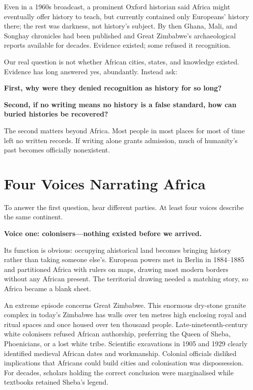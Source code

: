 Even in a 1960s broadcast, a prominent Oxford historian said Africa might eventually offer history to teach, but currently contained only Europeans' history there; the rest was darkness, not history's subject. By then Ghana, Mali, and Songhay chronicles had been published and Great Zimbabwe's archaeological reports available for decades. Evidence existed; some refused it recognition.

Our real question is not whether African cities, states, and knowledge existed. Evidence has long answered yes, abundantly. Instead ask:

\textbf{First, why were they denied recognition as history for so long?}

\textbf{Second, if no writing means no history is a false standard, how can buried histories be recovered?}

The second matters beyond Africa. Most people in most places for most of time left no written records. If writing alone grants admission, much of humanity's past becomes officially nonexistent.

\section{Four Voices Narrating Africa}
To answer the first question, hear different parties. At least four voices describe the same continent.

\textbf{Voice one: colonisers---nothing existed before we arrived.}

Its function is obvious: occupying ahistorical land becomes bringing history rather than taking someone else's. European powers met in Berlin in 1884--1885 and partitioned Africa with rulers on maps, drawing most modern borders without any African present. The territorial drawing needed a matching story, so Africa became a blank sheet.

An extreme episode concerns Great Zimbabwe. This enormous dry-stone granite complex in today's Zimbabwe has walls over ten metres high enclosing royal and ritual spaces and once housed over ten thousand people. Late-nineteenth-century white colonisers refused African authorship, preferring the Queen of Sheba, Phoenicians, or a lost white tribe. Scientific excavations in 1905 and 1929 clearly identified medieval African dates and workmanship. Colonial officials disliked implications that Africans could build cities and colonisation was dispossession. For decades, scholars holding the correct conclusion were marginalised while textbooks retained Sheba's legend.

